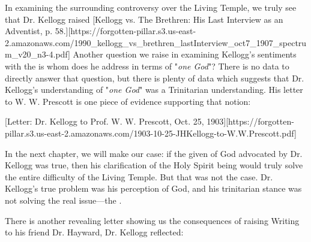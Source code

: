 In examining the surrounding controversy over the Living Temple, we truly see that Dr. Kellogg raised [Kellogg vs. The Brethren: His Last Interview as an Adventist, p. 58.][https://forgotten-pillar.s3.us-east-2.amazonaws.com/1990\_kellogg\_vs\_brethren\_lastInterview\_oct7\_1907\_spectrum\_v20\_n3-4.pdf] Another question we raise in examining Kellogg's sentiments with the  is whom does he address in terms of "\textit{one God}"? There is no data to directly answer that question, but there is plenty of data which suggests that Dr. Kellogg's understanding of "\textit{one God}" was a Trinitarian understanding. His letter to W. W. Prescott is one piece of evidence supporting that notion:

[Letter: Dr. Kellogg to Prof. W. W. Prescott, Oct. 25, 1903][https://forgotten-pillar.s3.us-east-2.amazonaws.com/1903-10-25-JHKellogg-to-W.W.Prescott.pdf]

In the next chapter, we will make our case: if the given  of God advocated by Dr. Kellogg was true, then his clarification of the Holy Spirit being  would truly solve the entire difficulty of the Living Temple. But that was not the case. Dr. Kellogg's true problem was his perception of God, and his trinitarian stance was not solving the real issue—the .

There is another revealing letter showing us the consequences of raising  Writing to his friend Dr. Hayward, Dr. Kellogg reflected:


